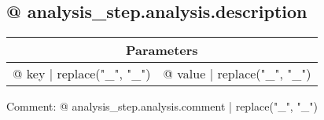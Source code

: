 \subsection{{@ analysis_step.analysis.description }}

\vspace*{1ex}
\begin{tabular}{ll}
\toprule
\multicolumn{2}{c}{\textbf{Parameters}}
\\
\midrule
{@ key | replace("_", "\_") } & {@ value | replace("_", "\_") }
\\
\bottomrule
\end{tabular}
\vspace*{1ex}

Comment: {@ analysis_step.analysis.comment | replace("_", "\_") }
